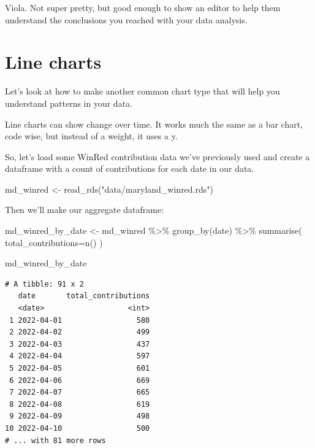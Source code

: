 \documentclass[
  letterpaper,
  DIV=11,
  numbers=noendperiod]{scrreprt}
\newenvironment{Shaded}{\begin{snugshade}}{\end{snugshade}}
\newcommand{\AttributeTok}[1]{\textcolor[rgb]{0.40,0.45,0.13}{#1}}
\newcommand{\FunctionTok}[1]{\textcolor[rgb]{0.28,0.35,0.67}{#1}}
\newcommand{\NormalTok}[1]{\textcolor[rgb]{0.00,0.23,0.31}{#1}}
\newcommand{\OtherTok}[1]{\textcolor[rgb]{0.00,0.23,0.31}{#1}}
\newcommand{\SpecialCharTok}[1]{\textcolor[rgb]{0.37,0.37,0.37}{#1}}
\newcommand{\StringTok}[1]{\textcolor[rgb]{0.13,0.47,0.30}{#1}}
\begin{document}
Viola. Not super pretty, but good enough to show an editor to help them
understand the conclusions you reached with your data analysis.

\hypertarget{line-charts}{%
\section{Line charts}\label{line-charts}}

Let's look at how to make another common chart type that will help you
understand patterns in your data.

Line charts can show change over time. It works much the same as a bar
chart, code wise, but instead of a weight, it uses a y.

So, let's load some WinRed contribution data we've previously used and
create a dataframe with a count of contributions for each date in our
data.

\begin{Shaded}
\begin{Highlighting}[]
\NormalTok{md\_winred }\OtherTok{\textless{}{-}} \FunctionTok{read\_rds}\NormalTok{(}\StringTok{"data/maryland\_winred.rds"}\NormalTok{)}
\end{Highlighting}
\end{Shaded}

Then we'll make our aggregate dataframe:

\begin{Shaded}
\begin{Highlighting}[]
\NormalTok{md\_winred\_by\_date }\OtherTok{\textless{}{-}}\NormalTok{ md\_winred }\SpecialCharTok{\%\textgreater{}\%}
  \FunctionTok{group\_by}\NormalTok{(date) }\SpecialCharTok{\%\textgreater{}\%}
  \FunctionTok{summarise}\NormalTok{(}
    \AttributeTok{total\_contributions=}\FunctionTok{n}\NormalTok{()}
\NormalTok{  )}

\NormalTok{md\_winred\_by\_date }
\end{Highlighting}
\end{Shaded}

\begin{verbatim}
# A tibble: 91 x 2
   date       total_contributions
   <date>                   <int>
 1 2022-04-01                 580
 2 2022-04-02                 499
 3 2022-04-03                 437
 4 2022-04-04                 597
 5 2022-04-05                 601
 6 2022-04-06                 669
 7 2022-04-07                 665
 8 2022-04-08                 619
 9 2022-04-09                 498
10 2022-04-10                 500
# ... with 81 more rows
\end{verbatim}
\end{document}
